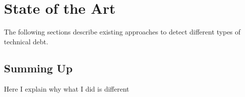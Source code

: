 
\chapter{State of the Art}
The following sections describe existing approaches to detect different types of technical debt.






\section{Summing Up}
Here I explain why what I did is different
